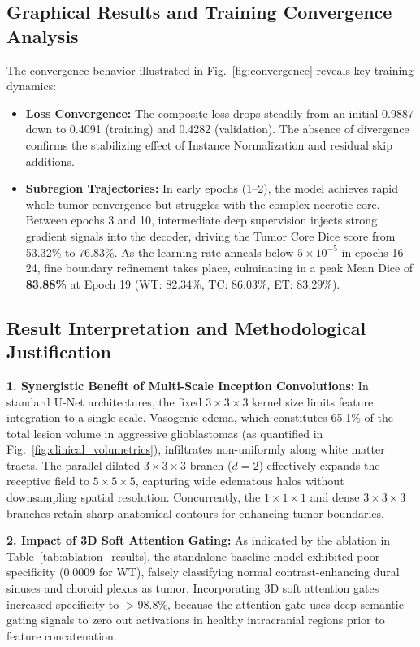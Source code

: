 \documentclass[conference]{IEEEtran}
\begin{document}
\subsection{Graphical Results and Training Convergence Analysis}
The convergence behavior illustrated in Fig.~\ref{fig:convergence} reveals key training dynamics:
\begin{itemize}
    \item \textbf{Loss Convergence:} The composite loss drops steadily from an initial 0.9887 down to 0.4091 (training) and 0.4282 (validation). The absence of divergence confirms the stabilizing effect of Instance Normalization and residual skip additions.
    \item \textbf{Subregion Trajectories:} In early epochs (1--2), the model achieves rapid whole-tumor convergence but struggles with the complex necrotic core. Between epochs 3 and 10, intermediate deep supervision injects strong gradient signals into the decoder, driving the Tumor Core Dice score from 53.32\% to 76.83\%. As the learning rate anneals below $5 \times 10^{-5}$ in epochs 16--24, fine boundary refinement takes place, culminating in a peak Mean Dice of \textbf{83.88\%} at Epoch 19 (WT: 82.34\%, TC: 86.03\%, ET: 83.29\%).
\end{itemize}

\subsection{Result Interpretation and Methodological Justification}
\textbf{1. Synergistic Benefit of Multi-Scale Inception Convolutions:} In standard U-Net architectures, the fixed $3\times 3\times 3$ kernel size limits feature integration to a single scale. Vasogenic edema, which constitutes 65.1\% of the total lesion volume in aggressive glioblastomas (as quantified in Fig.~\ref{fig:clinical_volumetrics}), infiltrates non-uniformly along white matter tracts. The parallel dilated $3\times 3\times 3$ branch ($d=2$) effectively expands the receptive field to $5\times 5\times 5$, capturing wide edematous halos without downsampling spatial resolution. Concurrently, the $1\times 1\times 1$ and dense $3\times 3\times 3$ branches retain sharp anatomical contours for enhancing tumor boundaries.

\textbf{2. Impact of 3D Soft Attention Gating:} As indicated by the ablation in Table~\ref{tab:ablation_results}, the standalone baseline model exhibited poor specificity (0.0009 for WT), falsely classifying normal contrast-enhancing dural sinuses and choroid plexus as tumor. Incorporating 3D soft attention gates increased specificity to $>$98.8\%, because the attention gate uses deep semantic gating signals to zero out activations in healthy intracranial regions prior to feature concatenation.
\end{document}
